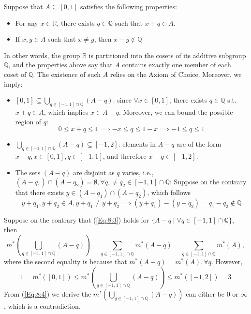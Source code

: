 \begin{example}\label{exp:8:2}
Suppose that $A\subseteq[0,1]$ satisfies the following properties:
\begin{itemize}
\item
For any $x\in\mathbb{R}$,
there exists $q\in\mathbb{Q}$ such that
$x+q\in A$.
\item
If $x,y\in A$ such that $x\ne y$, then $x-y\notin\mathbb{Q}$
\end{itemize}
In other words, 
the group $\mathbb{R}$ is partitioned into the cosets of its additive subgroup $\mathbb{Q}$, and the properties above say that $A$ contains exactly one member of each coset of $\mathbb{Q}$.
The existence of such $A$ relies on the Axiom of Choice.
Moreover, we imply:
\begin{itemize}
\item
$[0,1]\subseteq\bigcup_{q\in[-1,1]\cap\mathbb{Q}}(A-q)$:
since $\forall x\in[0,1]$, there exists $q\in\mathbb{Q}$ s.t. $x+q\in A$, which implies $x\in A-q$.
Moreover, we can bound the possible region of $q$:
\[
0\le x+q\le 1\implies -x\le q\le 1-x\implies -1\le q\le 1
\]
\item
$\bigcup_{q\in[-1,1]\cap\mathbb{Q}}(A-q)\subseteq[-1,2]$:
elements in $A-q$ are of the form $x-q, x\in[0,1],q\in[-1,1]$, and therefore $x-q\in[-1,2]$.
\item
The sets $(A-q)$ are disjoint as $q$ varies, i.e., $(A-q_1)\cap(A-q_2)=\emptyset,\forall q_1\ne q_2\in[-1,1]\cap\mathbb{Q}$:
Suppose on the contrary that there exists $y\in (A-q_1)\cap(A-q_2)$, which follows
\[
y+q_1,y+q_2\in A,
y+q_1\ne y+q_2\implies
(y+q_1)-(y+q_2)=q_1-q_2\notin\mathbb{Q}
\]
\end{itemize}
Suppose on the contrary that (\ref{Eq:8:3}) holds for $\{A-q\mid\forall q\in[-1,1]\cap\mathbb{Q}\}$, then
\begin{equation}\label{Eq:8:4}
m^*\left(\bigcup_{q\in[-1,1]\cap\mathbb{Q}}(A-q)\right)=\sum_{q\in[-1,1]\cap\mathbb{Q}}m^*(A-q)=\sum_{q\in[-1,1]\cap\mathbb{Q}}m^*(A),
\end{equation}
where the second equality is because that $m^*(A-q)=m^*(A),\forall q$.
However,
\begin{equation}\label{Eq:8:5}
1=m^*([0,1])\le m^*\left(\bigcup_{q\in[-1,1]\cap\mathbb{Q}}(A-q)\right)\le m^*([-1,2])=3
\end{equation}
From (\ref{Eq:8:4}) we derive the $m^*\left(\bigcup_{q\in[-1,1]\cap\mathbb{Q}}(A-q)\right)$ can either be $0$ or $\infty$, which is a contradiction.
\end{example}
